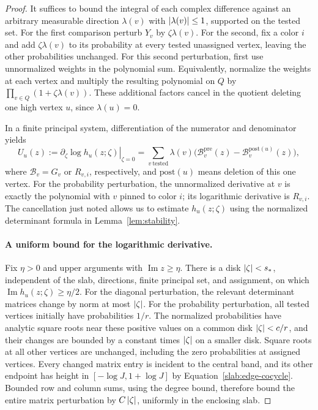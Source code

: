 \begin{proof}
It suffices to bound the integral of each complex difference against
an arbitrary measurable direction $\lambda(v)$ with
$\left|\lambda(v)\right|\leq1$, supported on the tested set. For the first
comparison perturb $Y_v$ by $\zeta\lambda(v)$. For the second, fix a
color $i$ and add $\zeta\lambda(v)$ to its probability at every tested
unassigned vertex, leaving the other probabilities unchanged. For
this second perturbation, first use unnormalized weights in the
polynomial sum. Equivalently, normalize the weights at each vertex
and multiply the resulting polynomial on $Q$ by
$\prod_{v\in Q}(1+\zeta\lambda(v))$. These additional factors cancel
in the quotient deleting one high vertex $u$, since
$\lambda(u)=0$.

In a finite principal system, differentiation of the numerator and
denominator yields
\begin{equation}
 U_u(z):=\left.\partial_\zeta\log h_u(z;\zeta)\right|_{\zeta=0}
 =\sum_{v\ \mathrm{tested}}\lambda(v)
   \bigl(\mathcal B_v^{\mathrm{pre}}(z)
        -\mathcal B_v^{\mathrm{post}(u)}(z)\bigr),
 \label{slab:derivative-identity}
\end{equation}
where $\mathcal B_v=G_v$ or $R_{v,i}$, respectively, and
$\mathrm{post}(u)$ means deletion of this one vertex. For the
probability perturbation, the unnormalized derivative at $v$ is
exactly the polynomial with $v$ pinned to color $i$; its logarithmic
derivative is $R_{v,i}$. The cancellation just noted allows us to
estimate $h_u(z;\zeta)$ using the normalized determinant formula in
Lemma~\ref{lem:stability}.

\paragraph{A uniform bound for the logarithmic derivative.}
Fix $\eta>0$ and upper arguments with $\operatorname{Im}z\geq\eta$.
There is a disk $\left|\zeta\right|<s_*$, independent of the slab, directions,
finite principal set, and assignment, on which
$\operatorname{Im}h_u(z;\zeta)\geq\eta/2$.
For the diagonal perturbation, the relevant determinant matrices
change by norm at most $\left|\zeta\right|$.
For the probability perturbation, all tested vertices initially have
probabilities $1/r$. The normalized probabilities have analytic square
roots near these positive values on a common disk
$\left|\zeta\right|<c/r$, and their changes are bounded by a constant times
$\left|\zeta\right|$ on a smaller disk. Square roots at all other vertices
are unchanged, including the zero probabilities at assigned vertices.
Every changed matrix entry is incident to the central band, and its
other endpoint has height in $[-\log J,1+\log J]$ by
Equation~\eqref{slab:edge-cocycle}. Bounded row and column sums,
using the degree bound, therefore bound the entire matrix perturbation
by $C\left|\zeta\right|$, uniformly in the enclosing slab.


\end{proof}
